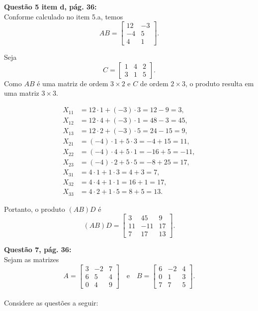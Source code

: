 \documentclass[a4paper,12pt]{article}
\begin{document}
\textbf{Questão 5 item d, pág. 36:}\\

Conforme calculado no item 5.a, temos
\[
AB = \begin{bmatrix}
12 & -3 \\
-4 & 5 \\
4 & 1
\end{bmatrix}.
\]

Seja
\[
C = \begin{bmatrix}
1 & 4 & 2 \\
3 & 1 & 5
\end{bmatrix}.
\]
Como \(AB\) é uma matriz de ordem \(3 \times 2\) e \(C\) de ordem \(2 \times 3\), o produto resulta em uma matriz \(3 \times 3\).

\[
\begin{aligned}
X_{11} &= 12\cdot 1 + (-3)\cdot 3 = 12 - 9 = 3,\\[4mm]
X_{12} &= 12\cdot 4 + (-3)\cdot 1 = 48 - 3 = 45,\\[4mm]
X_{13} &= 12\cdot 2 + (-3)\cdot 5 = 24 - 15 = 9,\\[8mm]
X_{21} &= (-4)\cdot 1 + 5\cdot 3 = -4 + 15 = 11,\\[4mm]
X_{22} &= (-4)\cdot 4 + 5\cdot 1 = -16 + 5 = -11,\\[4mm]
X_{23} &= (-4)\cdot 2 + 5\cdot 5 = -8 + 25 = 17,\\[8mm]
X_{31} &= 4\cdot 1 + 1\cdot 3 = 4 + 3 = 7,\\[4mm]
X_{32} &= 4\cdot 4 + 1\cdot 1 = 16 + 1 = 17,\\[4mm]
X_{33} &= 4\cdot 2 + 1\cdot 5 = 8 + 5 = 13.
\end{aligned}
\]

Portanto, o produto \((AB)D\) é
\[
(AB)D = \begin{bmatrix}
3 & 45 & 9 \\
11 & -11 & 17 \\
7 & 17 & 13
\end{bmatrix}.
\]


\textbf{Questão 7, pág. 36:}\\

Sejam as matrizes
\[
A = \begin{bmatrix}
3 & -2 & 7 \\
6 & 5 & 4 \\
0 & 4 & 9
\end{bmatrix}
\quad \text{e} \quad
B = \begin{bmatrix}
6 & -2 & 4 \\
0 & 1 & 3 \\
7 & 7 & 5
\end{bmatrix}.
\]
\\
Considere as questões a seguir:\\
\end{document}
